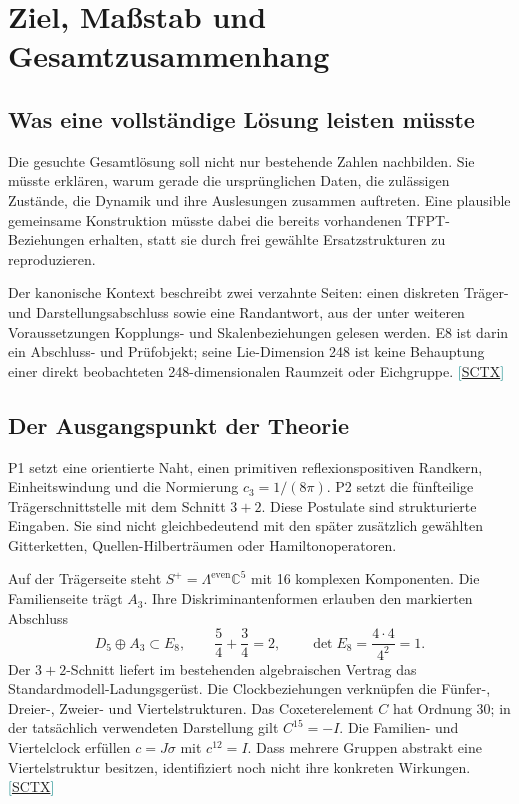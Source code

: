 \documentclass[11pt,a4paper,oneside,parskip=half,headings=normal,numbers=noenddot,bibliography=totoc]{scrreprt}
\newcommand{\C}{\mathbb C}
\newcommand{\src}[1]{\textcolor{teal}{\small[\hyperref[s:#1]{S#1}]}}
\begin{document}
\chapter{Ziel, Maßstab und Gesamtzusammenhang}
\section{Was eine vollständige Lösung leisten müsste}
Die gesuchte Gesamtlösung soll nicht nur bestehende Zahlen nachbilden. Sie müsste erklären, warum gerade die ursprünglichen Daten, die zulässigen Zustände, die Dynamik und ihre Auslesungen zusammen auftreten. Eine plausible gemeinsame Konstruktion müsste dabei die bereits vorhandenen TFPT-Beziehungen erhalten, statt sie durch frei gewählte Ersatzstrukturen zu reproduzieren.

Der kanonische Kontext beschreibt zwei verzahnte Seiten: einen diskreten Träger- und Darstellungsabschluss sowie eine Randantwort, aus der unter weiteren Voraussetzungen Kopplungs- und Skalenbeziehungen gelesen werden. E8 ist darin ein Abschluss- und Prüfobjekt; seine Lie-Dimension 248 ist keine Behauptung einer direkt beobachteten 248-dimensionalen Raumzeit oder Eichgruppe. \src{CTX}

\section{Der Ausgangspunkt der Theorie}
P1 setzt eine orientierte Naht, einen primitiven reflexionspositiven Randkern, Einheitswindung und die Normierung $c_3=1/(8\pi)$. P2 setzt die fünfteilige Trägerschnittstelle mit dem Schnitt $3+2$. Diese Postulate sind strukturierte Eingaben. Sie sind nicht gleichbedeutend mit den später zusätzlich gewählten Gitterketten, Quellen-Hilberträumen oder Hamiltonoperatoren.

Auf der Trägerseite steht $S^+=\Lambda^{\mathrm{even}}\C^5$ mit 16 komplexen Komponenten. Die Familienseite trägt $A_3$. Ihre Diskriminantenformen erlauben den markierten Abschluss
\[
 D_5\oplus A_3\subset E_8,\qquad
 \frac54+\frac34=2,\qquad
 \det E_8=\frac{4\cdot4}{4^2}=1.
\]
Der $3+2$-Schnitt liefert im bestehenden algebraischen Vertrag das Standardmodell-Ladungsgerüst. Die Clockbeziehungen verknüpfen die Fünfer-, Dreier-, Zweier- und Viertelstrukturen. Das Coxeterelement $C$ hat Ordnung 30; in der tatsächlich verwendeten Darstellung gilt $C^{15}=-I$. Die Familien- und Viertelclock erfüllen $c=J\sigma$ mit $c^{12}=I$. Dass mehrere Gruppen abstrakt eine Viertelstruktur besitzen, identifiziert noch nicht ihre konkreten Wirkungen. \src{CTX}
\end{document}
